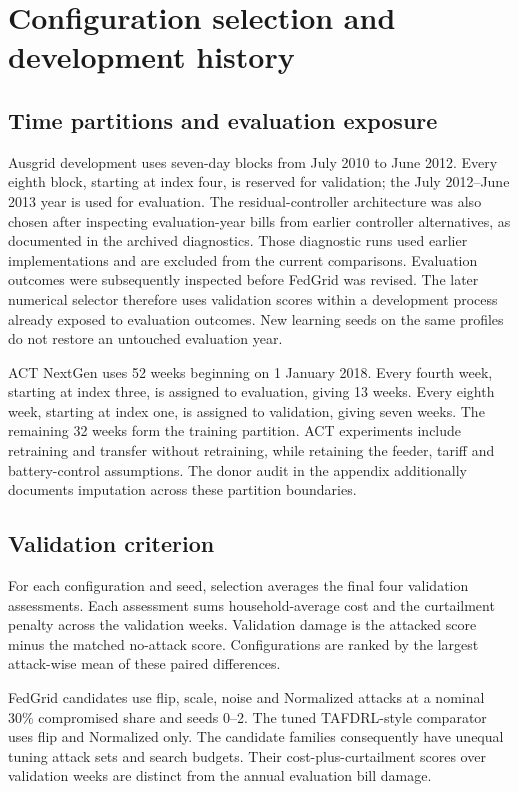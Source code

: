 \documentclass[preprint,12pt,a4paper]{elsarticle}
\begin{document}


\section{Configuration selection and development history}
\label{sec:selection}
\subsection{Time partitions and evaluation exposure}
Ausgrid development uses seven-day blocks from July 2010 to June 2012. Every eighth block, starting at index four, is reserved for validation; the July 2012--June 2013 year is used for evaluation. The residual-controller architecture was also chosen after inspecting evaluation-year bills from earlier controller alternatives, as documented in the archived diagnostics. Those diagnostic runs used earlier implementations and are excluded from the current comparisons. Evaluation outcomes were subsequently inspected before FedGrid was revised. The later numerical selector therefore uses validation scores within a development process already exposed to evaluation outcomes. New learning seeds on the same profiles do not restore an untouched evaluation year.

ACT NextGen uses 52 weeks beginning on 1 January 2018. Every fourth week, starting at index three, is assigned to evaluation, giving 13 weeks. Every eighth week, starting at index one, is assigned to validation, giving seven weeks. The remaining 32 weeks form the training partition. ACT experiments include retraining and transfer without retraining, while retaining the feeder, tariff and battery-control assumptions. The donor audit in the appendix additionally documents imputation across these partition boundaries.

\subsection{Validation criterion}
For each configuration and seed, selection averages the final four validation assessments. Each assessment sums household-average cost and the curtailment penalty across the validation weeks. Validation damage is the attacked score minus the matched no-attack score. Configurations are ranked by the largest attack-wise mean of these paired differences.

FedGrid candidates use flip, scale, noise and Normalized attacks at a nominal 30\% compromised share and seeds 0--2. The tuned TAFDRL-style comparator uses flip and Normalized only. The candidate families consequently have unequal tuning attack sets and search budgets. Their cost-plus-curtailment scores over validation weeks are distinct from the annual evaluation bill damage.
\end{document}
